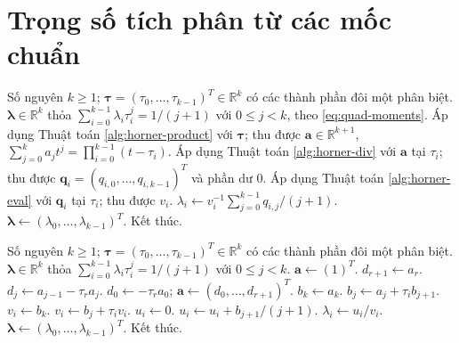 \documentclass[12pt,a4paper,oneside]{book}
\numberwithin{algorithm}{chapter}
\theoremstyle{definition}
\newcommand{\R}{\mathbb{R}}
\begin{document}
\section{Trọng số tích phân từ các mốc chuẩn}
\begin{algorithm}[H]
\caption{Dựng trọng số tích phân bằng Horner -- sơ lược}
\label{alg:quad-weights}
\begin{algorithmic}[1]
\Require Số nguyên $k\geq1$; $\boldsymbol\tau=(\tau_0,\ldots,\tau_{k-1})^T\in\R^k$ có các thành phần đôi một phân biệt.
\Ensure $\boldsymbol\lambda\in\R^k$ thỏa $\sum_{i=0}^{k-1}\lambda_i\tau_i^j=1/(j+1)$ với $0\leq j<k$, theo \eqref{eq:quad-moments}.
\State Áp dụng Thuật toán \ref{alg:horner-product} với $\boldsymbol\tau$; thu được $\boldsymbol a\in\R^{k+1}$, $\sum_{j=0}^ka_jt^j=\prod_{i=0}^{k-1}(t-\tau_i)$.
  \State Áp dụng Thuật toán \ref{alg:horner-div} với $\boldsymbol a$ tại $\tau_i$; thu được $\boldsymbol q_i=(q_{i,0},\ldots,q_{i,k-1})^T$ và phần dư $0$.
  \State Áp dụng Thuật toán \ref{alg:horner-eval} với $\boldsymbol q_i$ tại $\tau_i$; thu được $v_i$.
  \State $\lambda_i\gets v_i^{-1}\sum_{j=0}^{k-1}q_{i,j}/(j+1)$.
\EndFor
\Statex
\State $\boldsymbol\lambda\gets(\lambda_0,\ldots,\lambda_{k-1})^T$.
\State Kết thúc.
\end{algorithmic}
\end{algorithm}

\begin{algorithm}[H]
\caption{Dựng trọng số tích phân bằng Horner -- chi tiết}
\label{alg:quad-weights-detailed}
\small
\begin{algorithmic}[1]
\Require Số nguyên $k\geq1$; $\boldsymbol\tau=(\tau_0,\ldots,\tau_{k-1})^T\in\R^k$ có các thành phần đôi một phân biệt.
\Ensure $\boldsymbol\lambda\in\R^k$ thỏa $\sum_{i=0}^{k-1}\lambda_i\tau_i^j=1/(j+1)$ với $0\leq j<k$.
\State $\boldsymbol a\gets(1)^T$.
  \State $d_{r+1}\gets a_r$.
    \State $d_j\gets a_{j-1}-\tau_ra_j$.
  \EndFor
  \Statex
  \State $d_0\gets-\tau_ra_0$; $\boldsymbol a\gets(d_0,\ldots,d_{r+1})^T$.
\EndFor
\Statex
{}
  \State $b_k\gets a_k$.
    \State $b_j\gets a_j+\tau_ib_{j+1}$.
  \EndFor
  \Statex
  \State $v_i\gets b_k$.
    \State $v_i\gets b_j+\tau_i v_i$.
  \EndFor
  \Statex
  \State $u_i\gets0$.
    \State $u_i\gets u_i+b_{j+1}/(j+1)$.
  \EndFor
  \Statex
  \State $\lambda_i\gets u_i/v_i$.
\EndFor
\Statex
\State $\boldsymbol\lambda\gets(\lambda_0,\ldots,\lambda_{k-1})^T$.
\State Kết thúc.
\end{algorithmic}
\end{algorithm}
\end{document}

